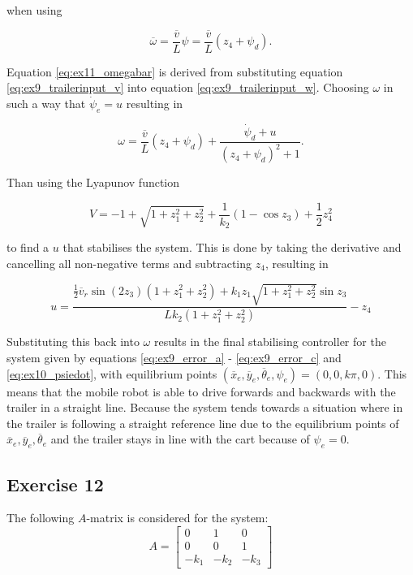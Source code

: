 when using 

\begin{equation}
    \overline{\omega} = \frac{\overline{v}}{L}\psi = \frac{\overline{v}}{L}(z_4+\psi_d). \label{eq:ex11_omegabar}
\end{equation}

Equation \eqref{eq:ex11_omegabar} is derived from substituting equation \eqref{eq:ex9_trailerinput_v} into equation \eqref{eq:ex9_trailerinput_w}. Choosing $\omega$ in such a way that $\dot{\psi}_e = u$ resulting in 

\begin{equation}
    \omega = \frac{\overline{v}}{L}(z_4+\psi_d) + \frac{\dot{\psi}_d + u}{(z_4+\psi_d)^2+1}. \label{eq:ex11_omega}
\end{equation}

Than using the Lyapunov function 

\begin{equation}
    V = -1 + \sqrt{1+z_1^2+z_2^2} + \frac{1}{k_2}(1-\cos z_3) + \frac{1}{2}z_4^2 \label{eq:ex11_lyap}
\end{equation}

to find a $u$ that stabilises the system. This is done by taking the derivative and cancelling all non-negative terms and subtracting $z_4$, resulting in 

\begin{equation}
    u = \frac{\frac{1}{2}\overline{v}_r\sin(2z_3)(1+z_1^2+z_2^2)+k_1z_1\sqrt{1+z_1^2+z_2^2}\sin z_3}{L k_2(1+z_1^2+z_2^2)} - z_4 \label{eq:ex11_u}
\end{equation}

Substituting this back into $\omega$ results in the final stabilising controller for the system given by equations \eqref{eq:ex9_error_a} - \eqref{eq:ex9_error_c} and \eqref{eq:ex10_psiedot}, with equilibrium points $(\overline{x}_e,\overline{y}_e,\overline{\theta}_e,\psi_e) = (0,0,k\pi,0)$. This means that the mobile robot is able to drive forwards and backwards with the trailer in a straight line. Because the system tends towards a situation where in the trailer is following a straight reference line due to the equilibrium points of $\overline{x}_e,\overline{y}_e,\overline{\theta}_e$ and the trailer stays in line with the cart because of $\psi_e = 0$.

\subsection{Exercise 12}
The following $A$-matrix is considered for the system:
\begin{equation}
    A = \begin{bmatrix}
    0 & 1 & 0 \\
    0 & 0 & 1 \\
    -k_1 & -k_2 & -k_3
    \end{bmatrix}
    \label{eq:ex12_A}
\end{equation}

